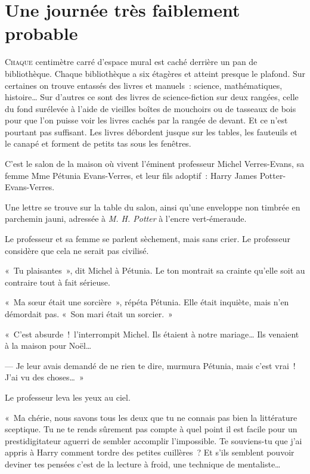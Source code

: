 \chapter{Une journée très faiblement probable}

\lettrine{C}{haque} centimètre carré d'espace mural est caché derrière un pan de bibliothèque. Chaque bibliothèque a six étagères et atteint presque le plafond. Sur certaines on trouve entassés des livres et manuels~: science, mathématiques, histoire… Sur d'autres ce sont des livres de science-fiction sur deux rangées, celle du fond surélevée à l'aide de vieilles boîtes de mouchoirs\footnotemark{} ou de tasseaux de bois pour que l'on puisse voir les livres cachés par la rangée de devant. Et ce n'est pourtant pas suffisant. Les livres débordent jusque sur les tables, les fauteuils et le canapé et forment de petits tas sous les fenêtres.

C'est le salon de la maison où vivent l'éminent professeur Michel Verres-Evans, sa femme Mme Pétunia Evans-Verres, et leur fils adoptif~: Harry James Potter-Evans-Verres.

Une lettre se trouve sur la table du salon, ainsi qu'une enveloppe non timbrée en parchemin jauni, adressée à \emph{M. H. Potter} à l'encre vert-émeraude.

Le professeur et sa femme se parlent sèchement, mais sans crier. Le professeur considère que cela ne serait pas civilisé.

«~Tu plaisantes~», dit Michel à Pétunia. Le ton montrait sa crainte qu'elle soit au contraire tout à fait sérieuse.

«~Ma sœur était une sorcière~», répéta Pétunia. Elle était inquiète, mais n'en démordait pas. «~Son mari était un sorcier.~»

«~C'est absurde~!~l'interrompit Michel.  Ils étaient à notre mariage… Ils venaient à la maison pour Noël…

--- Je leur avais demandé de ne rien te dire, murmura Pétunia, mais c'est vrai~! J'ai vu des choses…~»

Le professeur leva les yeux au ciel.

«~Ma chérie, nous savons tous les deux que tu ne connais pas bien la littérature sceptique.  Tu ne te rends sûrement pas compte à quel point il est facile pour un prestidigitateur aguerri de sembler accomplir l'impossible. Te souviens-tu que j'ai appris à Harry comment tordre des petites cuillères~? Et s'ils semblent pouvoir deviner tes pensées c'est de la lecture à froid, une technique de mentaliste…

